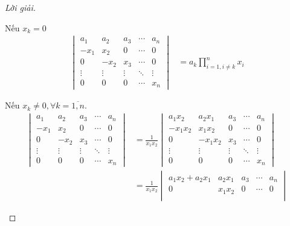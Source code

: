 \documentclass[class=linear-algebra,crop=false]{standalone}
\begin{document}
\begin{proof}[Lời giải]
\begin{enumerate}[label = (\alph*)]
		      \par Nếu $x_{k} = 0$
		      \begin{align*}
			      \begin{vmatrix}
				      a_{1}  & a_{2}  & a_{3}  & \cdots & a_{n}  \\
				      -x_{1} & x_{2}  & 0      & \cdots & 0      \\
				      0      & -x_{2} & x_{3}  & \cdots & 0      \\
				      \vdots & \vdots & \vdots & \ddots & \vdots \\
				      0      & 0      & 0      & \cdots & x_{n}
			      \end{vmatrix}
			       & = a_{k}\prod^{n}_{i=1,i\ne k} x_{i}
		      \end{align*}
		      \par Nếu $x_{k} \ne 0, \forall k=\overline{1, n}$.
		      \begingroup{}
		      \allowdisplaybreaks{}
		      \begin{align*}
			      \begin{vmatrix}
				      a_{1}  & a_{2}  & a_{3}  & \cdots & a_{n}  \\
				      -x_{1} & x_{2}  & 0      & \cdots & 0      \\
				      0      & -x_{2} & x_{3}  & \cdots & 0      \\
				      \vdots & \vdots & \vdots & \ddots & \vdots \\
				      0      & 0      & 0      & \cdots & x_{n}
			      \end{vmatrix}
			       & =
			      \frac{1}{x_{1}x_{2}}
			      \begin{vmatrix}
				      a_{1}x_{2}  & a_{2}x_{1}  & a_{3}  & \cdots & a_{n}  \\
				      -x_{1}x_{2} & x_{1}x_{2}  & 0      & \cdots & 0      \\
				      0           & -x_{1}x_{2} & x_{3}  & \cdots & 0      \\
				      \vdots      & \vdots      & \vdots & \ddots & \vdots \\
				      0           & 0           & 0      & \cdots & x_{n}
			      \end{vmatrix}                                                                                                \\
			       & = \frac{1}{x_{1}x_{2}}
			      \begin{vmatrix}
				      a_{1}x_{2} + a_{2}x_{1} & a_{2}x_{1}  & a_{3}  & \cdots & a_{n}  \\
				      0                       & x_{1}x_{2}  & 0      & \cdots & 0      \\

\end{vmatrix}
\end{align*}
\end{enumerate}
\end{proof}
\end{document}
